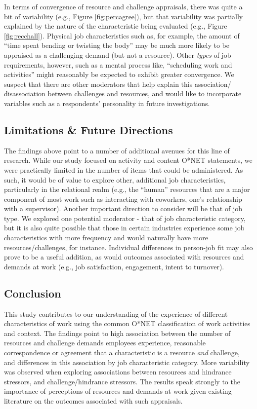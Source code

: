 \documentclass[
  jou]{apa6}
\begin{document}
In terms of convergence of resource and challenge appraisals, there was quite a bit of variability (e.g., Figure \ref{fig:percagree}), but that variability was partially explained by the nature of the characteristic being evaluated (e.g., Figure \ref{fig:recchall}). Physical job characteristics such as, for example, the amount of ``time spent bending or twisting the body'' may be much more likely to be appraised as a challenging demand (but not a resource). Other \emph{types} of job requirements, however, such as a mental process like, ``scheduling work and activities'' might reasonably be expected to exhibit greater convergence. We suspect that there are other moderators that help explain this association/ disassociation between challenges and resources, and would like to incorporate variables such as a respondents' personality in future investigations.

\hypertarget{limitations-future-directions}{%
\subsection{Limitations \& Future Directions}\label{limitations-future-directions}}

The findings above point to a number of additional avenues for this line of research. While our study focused on activity and content O*NET statements, we were practically limited in the number of items that could be administered. As such, it would be of value to explore other, additional job characteristics, particularly in the relational realm (e.g., the ``human'' resources that are a major component of most work such as interacting with coworkers, one's relationship with a supervisor). Another important direction to consider will be that of job type. We explored one potential moderator - that of job characteristic category, but it is also quite possible that those in certain industries experience some job characteristics with more frequency and would naturally have more resources/challenges, for instance. Individual differences in person-job fit may also prove to be a useful addition, as would outcomes associated with resources and demands at work (e.g., job satisfaction, engagement, intent to turnover).

\hypertarget{conclusion}{%
\subsection{Conclusion}\label{conclusion}}

This study contributes to our understanding of the experience of different characteristics of work using the common O*NET classification of work activities and context. The findings point to high association between the number of resources and challenge demands employees experience, reasonable correspondence or agreement that a characteristic is a resource \emph{and} challenge, and differences in this association by job characteristic category. More variability was observed when exploring associations between resources and hindrance stressors, and challenge/hindrance stressors. The results speak strongly to the importance of perceptions of resources and demands at work given existing literature on the outcomes associated with such appraisals.
\end{document}
